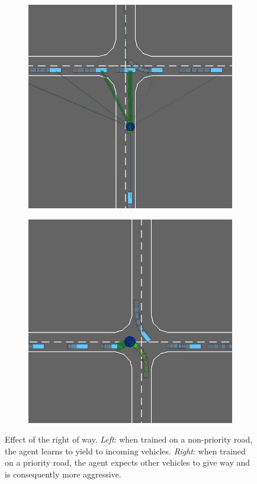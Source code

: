 \documentclass{article}
\begin{document}
 \begin{figure}[htp]
 	\centering
 	\begin{subfigure}[t]{.49\linewidth}
 		\includegraphics[width=\linewidth]{img/priority1}
 	\end{subfigure}
 	\begin{subfigure}[t]{.49\linewidth}
 		\includegraphics[width=\linewidth]{img/priority2}
 	\end{subfigure}
 	\caption{Effect of the right of way. \emph{Left}: when trained on a non-priority road, the agent learns to yield to incoming vehicles. \emph{Right}: when trained on a priority road, the agent expects other vehicles to give way and is consequently more aggressive.}
 	\label{fig:priority}
 \end{figure}
\end{document}
